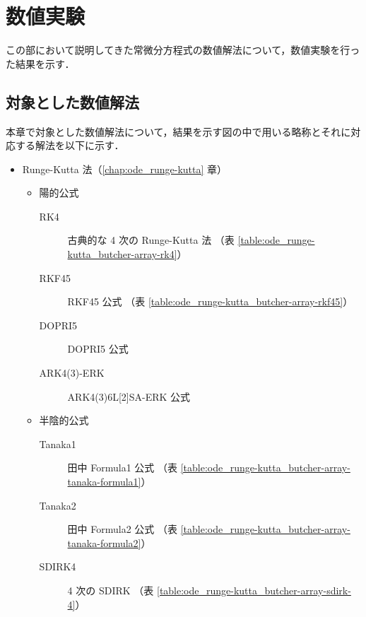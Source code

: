 %

\chapter{数値実験}

この部において説明してきた常微分方程式の数値解法について，数値実験を行った結果を示す．

\section{対象とした数値解法}

本章で対象とした数値解法について，結果を示す図の中で用いる略称とそれに対応する解法を以下に示す．

\begin{itemize}
    \item Runge-Kutta 法（\ref{chap:ode_runge-kutta} 章）
          \begin{itemize}
              \item 陽的公式
                    \begin{description}
                        \item[RK4] 古典的な 4 次の Runge-Kutta 法 \cite{Mitsui1993}
                              （表 \ref{table:ode_runge-kutta_butcher-array-rk4}）
                        \item[RKF45] RKF45 公式 \cite{Mitsui1993}
                              （表 \ref{table:ode_runge-kutta_butcher-array-rkf45}）
                        \item[DOPRI5] DOPRI5 公式 \cite{Hairer1991}
                        \item[ARK4(3)-ERK] ARK4(3)6L[2]SA-ERK 公式 \cite{Kennedy2003}
                    \end{description}
              \item 半陰的公式
                    \begin{description}
                        \item[Tanaka1] 田中 Formula1 公式 \cite{Togawa2007}
                              （表 \ref{table:ode_runge-kutta_butcher-array-tanaka-formula1}）
                        \item[Tanaka2] 田中 Formula2 公式 \cite{Togawa2007}
                              （表 \ref{table:ode_runge-kutta_butcher-array-tanaka-formula2}）
                        \item[SDIRK4] 4 次の SDIRK \cite[Section IV.6.]{Hairer1991}
                              （表 \ref{table:ode_runge-kutta_butcher-array-sdirk-4}）

\end{description}
\end{itemize}
\end{itemize}
